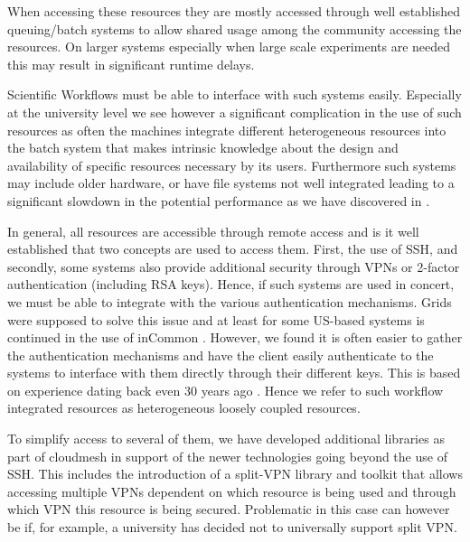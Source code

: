 \documentclass[utf8]{FrontiersinVancouver} %
\newcommand{\TODO}[1]{\todo[inline]{#1}}
\begin{document}
When accessing these resources they are mostly accessed through well established queuing/batch systems to allow shared usage among the community accessing the resources. On larger systems especially when large scale experiments are needed this may result in significant runtime delays.

Scientific Workflows must be able to interface with such systems easily. Especially at the university level we see however a significant complication in the use of such resources as often the machines integrate different heterogeneous resources into the batch system that makes intrinsic knowledge about the design and availability of specific resources necessary by its users. Furthermore such systems may include older hardware, or have file systems not well integrated leading to a significant slowdown in the potential performance as we have discovered in \citep{earthquake?}. \TODO{cite}

In general, all resources are accessible through remote access and is it well established that two concepts are used to access them. First, the use of SSH, and secondly, some systems also provide additional security through VPNs or 2-factor authentication (including RSA keys). Hence, if such systems are used in concert, we must be able to integrate with the various authentication mechanisms. Grids were supposed to solve this issue and at least for some US-based systems is continued in the use of inCommon \citep{incommon}. However, we found it is often easier to gather the authentication mechanisms and have the client easily authenticate to the systems to interface with them directly through their different keys. This is based on experience dating back even 30 years ago \cite{las-99-loosely}. Hence we refer to such workflow integrated resources as heterogeneous loosely coupled resources.

To simplify access to several of them, we have developed additional libraries as part of cloudmesh in
support of the newer technologies going beyond the use of SSH. This includes the introduction of a split-VPN library and toolkit that allows accessing multiple VPNs dependent on which resource is being used and through which VPN this resource is being secured. Problematic in this case can however be if, for example, a university has decided not to universally support split VPN.
\end{document}
